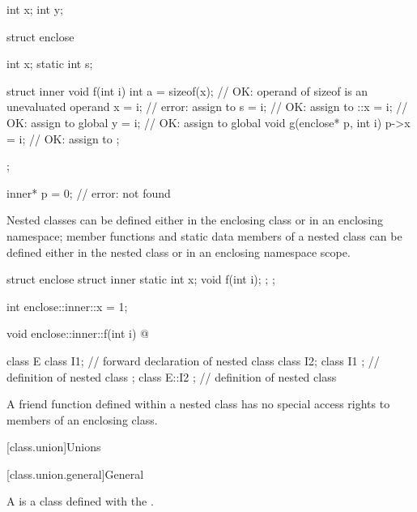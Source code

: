 \begin{example}
\begin{codeblock}
int x;
int y;

struct enclose {
  int x;
  static int s;

  struct inner {
    void f(int i) {
      int a = sizeof(x);        // OK: operand of sizeof is an unevaluated operand
      x = i;                    // error: assign to 
      s = i;                    // OK: assign to 
      ::x = i;                  // OK: assign to global 
      y = i;                    // OK: assign to global 
    }
    void g(enclose* p, int i) {
      p->x = i;                 // OK: assign to 
    }
  };
};

inner* p = 0;                   // error:  not found
\end{codeblock}
\end{example}

\pnum
\begin{note}
Nested classes can be defined
either in the enclosing class or in an enclosing namespace;
member functions and static data members of a nested class can be
defined either in the nested class or in an enclosing namespace scope.
\begin{example}
\begin{codeblock}
struct enclose {
  struct inner {
    static int x;
    void f(int i);
  };
};

int enclose::inner::x = 1;

void enclose::inner::f(int i) { @\commentellip@ }

class E {
  class I1;                     // forward declaration of nested class
  class I2;
  class I1 { };                 // definition of nested class
};
class E::I2 { };                // definition of nested class
\end{codeblock}
\end{example}
\end{note}

\pnum
{}%
A friend function defined
within a nested class has no special access rights to
members of an enclosing class.

[class.union]{Unions}%

[class.union.general]{General}%

\pnum
A  is a class defined with the 
.

